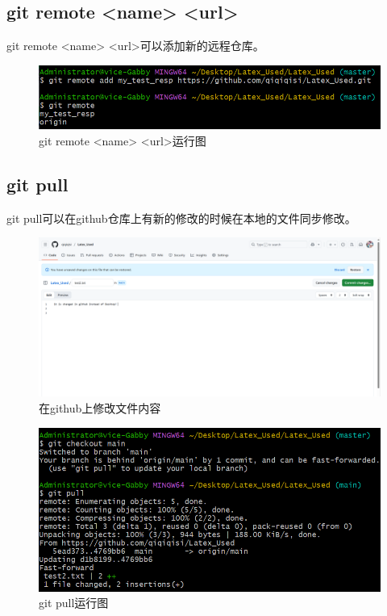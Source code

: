 \documentclass{article}
\begin{document}
\subsection{git remote <name> <url>}
git remote <name> <url>可以添加新的远程仓库。
\begin{figure}[H]
    \centering
    \includegraphics[width=1\linewidth]{git_remote_name.png}
    \caption{git remote <name> <url>运行图}
    \label{fig:remotename}
\end{figure}

\subsection{git pull}
git pull可以在github仓库上有新的修改的时候在本地的文件同步修改。
\begin{figure}[H]
    \centering
    \includegraphics[width=1\linewidth]{github修改文件.png}
    \caption{在github上修改文件内容}
    \label{fig:pull}
\end{figure}
\begin{figure}[H]
    \centering
    \includegraphics[width=1\linewidth]{git_pull.png}
    \caption{git pull运行图}
    \label{fig:pull1}
\end{figure}
\end{document}
